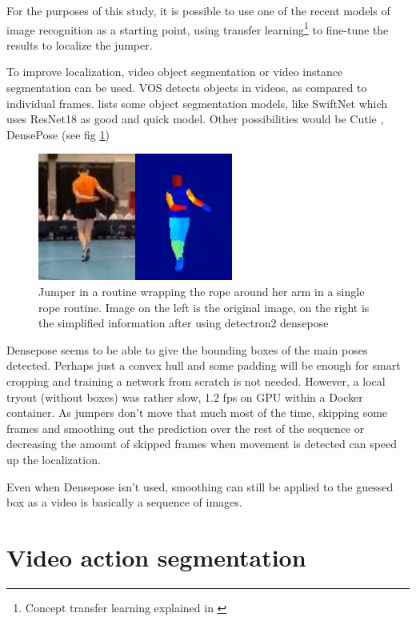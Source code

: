 For the purposes of this study, it is possible to use one of the recent models of image recognition as a starting point, using transfer learning\footnote{Concept transfer learning explained in \autocite{Bharadiya_2023}} to fine-tune the results to localize the jumper.

To improve localization, video object segmentation or video instance segmentation can be used. VOS detects objects in videos, as compared to individual frames. \textcite{Gao_2022} lists some object segmentation models, like SwiftNet \autocite{Wang_2021} which uses ResNet18 as good and quick model.
Other possibilities would be Cutie \autocite{Cheng_2023}, DensePose (see fig \ref{fig:srwrap-bp}) \autocite{Guler_2018}

\begin{figure}
    \centering
    \includegraphics[width=0.3\linewidth]{../graphics/sr-denseposed}
    \caption[Image vs Densposed image]{Jumper in a routine wrapping the rope around her arm in a single rope routine. Image on the left is the original image, on the right is the simplified information after using detectron2 densepose \autocite{wu2019detectron2}}
    \label{fig:srwrap-bp}
\end{figure}

Densepose seems to be able to give the bounding boxes of the main poses detected. Perhaps just a convex hull and some padding will be enough for smart cropping and training a network from scratch is not needed.
However, a local tryout (without boxes) was rather slow, 1.2 fps on GPU within a Docker container.
As jumpers don't move that much most of the time, skipping some frames and smoothing out the prediction over the rest of the sequence or decreasing the amount of skipped frames when movement is detected can speed up the localization.

Even when Densepose isn't used, smoothing can still be applied to the guessed box as a video is basically a sequence of images.


\section{Video action segmentation}
\label{lit:video-action-segmentation}

